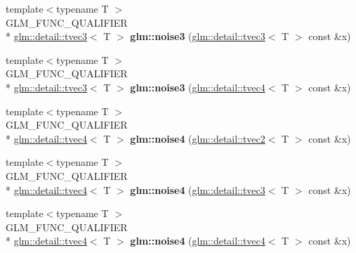\begin{DoxyCompactItemize}
\item 
\hypertarget{namespaceglm_a40d0d9df93beb7d0c8b621a28ea59bd2}{{\footnotesize template$<$typename T $>$ }\\G\-L\-M\-\_\-\-F\-U\-N\-C\-\_\-\-Q\-U\-A\-L\-I\-F\-I\-E\-R \\*
\hyperlink{structglm_1_1detail_1_1tvec3}{glm\-::detail\-::tvec3}$<$ T $>$ {\bfseries glm\-::noise3} (\hyperlink{structglm_1_1detail_1_1tvec3}{glm\-::detail\-::tvec3}$<$ T $>$ const \&x)}\label{namespaceglm_a40d0d9df93beb7d0c8b621a28ea59bd2}

\item 
\hypertarget{namespaceglm_a9119e91ca516dcbf0e4788cb13f6cf25}{{\footnotesize template$<$typename T $>$ }\\G\-L\-M\-\_\-\-F\-U\-N\-C\-\_\-\-Q\-U\-A\-L\-I\-F\-I\-E\-R \\*
\hyperlink{structglm_1_1detail_1_1tvec3}{glm\-::detail\-::tvec3}$<$ T $>$ {\bfseries glm\-::noise3} (\hyperlink{structglm_1_1detail_1_1tvec4}{glm\-::detail\-::tvec4}$<$ T $>$ const \&x)}\label{namespaceglm_a9119e91ca516dcbf0e4788cb13f6cf25}

\item 
\hypertarget{namespaceglm_a5a9bee7392c533fb77629d57f30cddb9}{{\footnotesize template$<$typename T $>$ }\\G\-L\-M\-\_\-\-F\-U\-N\-C\-\_\-\-Q\-U\-A\-L\-I\-F\-I\-E\-R \\*
\hyperlink{structglm_1_1detail_1_1tvec4}{glm\-::detail\-::tvec4}$<$ T $>$ {\bfseries glm\-::noise4} (\hyperlink{structglm_1_1detail_1_1tvec2}{glm\-::detail\-::tvec2}$<$ T $>$ const \&x)}\label{namespaceglm_a5a9bee7392c533fb77629d57f30cddb9}

\item 
\hypertarget{namespaceglm_a6ab9ad0230446bf1a440b9c93186586d}{{\footnotesize template$<$typename T $>$ }\\G\-L\-M\-\_\-\-F\-U\-N\-C\-\_\-\-Q\-U\-A\-L\-I\-F\-I\-E\-R \\*
\hyperlink{structglm_1_1detail_1_1tvec4}{glm\-::detail\-::tvec4}$<$ T $>$ {\bfseries glm\-::noise4} (\hyperlink{structglm_1_1detail_1_1tvec3}{glm\-::detail\-::tvec3}$<$ T $>$ const \&x)}\label{namespaceglm_a6ab9ad0230446bf1a440b9c93186586d}

\item 
\hypertarget{namespaceglm_adcaee6089d990bbe782c20cea1ebe337}{{\footnotesize template$<$typename T $>$ }\\G\-L\-M\-\_\-\-F\-U\-N\-C\-\_\-\-Q\-U\-A\-L\-I\-F\-I\-E\-R \\*
\hyperlink{structglm_1_1detail_1_1tvec4}{glm\-::detail\-::tvec4}$<$ T $>$ {\bfseries glm\-::noise4} (\hyperlink{structglm_1_1detail_1_1tvec4}{glm\-::detail\-::tvec4}$<$ T $>$ const \&x)}\label{namespaceglm_adcaee6089d990bbe782c20cea1ebe337}

\end{DoxyCompactItemize}


